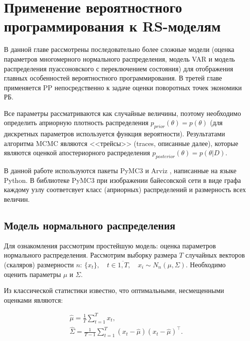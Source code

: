 \documentclass[a4paper,14pt]{extreport}
\begin{document}
\section{Применение вероятностного программирования к RS-моделям}

\label{section:pp_for_rs}

В данной главе рассмотрены последовательно более сложные модели (оценка параметров многомерного нормального распределения, модель VAR и модель распределения пуассоновского с переключением состояния) для отображения главных особенностей вероятностного программирования. В третей главе применяется PP непосредственно к задаче оценки поворотных точек экономики РБ.

Все параметры рассматриваются как случайные величины, поэтому необходимо определить априорную плотность распределения $p_{prior}(\theta) = p(\theta)$ (для дискретных параметров используется функция вероятности). Результатами алгоритма MCMC являются <<трейсы>> (traces, описанные далее), которые являются оценкой апостериорного распределения $p_{posterior}(\theta) = p(\theta|D)$.

В данной работе используются пакеты PyMC3 \cite{pymc3_2016} и Arviz \cite{arviz_2019}, написанные на языке Python. В библиотеке PyMC3 при изображении байесовской сети в виде графа каждому узлу соответсвует класс (априорных) распределений и размерность всех величин.


\subsection{Модель нормального распределения}

\label{subsection:mvn}

Для ознакомления рассмотрим простейшую модель: оценка параметров нормального распределения. Рассмотрим выборку размера $T$ случайных векторов (скаляров) размерности $n$: $\{x_t\}, \quad t\in\overline{1,T}, \quad x_i \sim N_n(\mu, \Sigma)$. Необходимо оценить параметры $\mu$ и $\Sigma$. 

Из классической статистики известно, что оптимальными, несмещенными оценками являются:

\begin{equation}
	\begin{multlined}
		\hat{\mu}=\frac{1}{T}\sum\limits_{t=1}^{T}{x_t}, \\
		\hat{\Sigma}=\frac{1}{T-1}\sum\limits_{t=1}^{T}{(x_t-\hat{\mu})(x_t-\hat{\mu})^\top} . 
	\end{multlined}
\end{equation}
\end{document}
